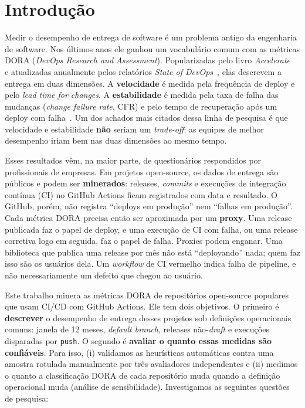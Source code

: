 
\section{Introdução}
\label{sec:introducao}

Medir o desempenho de entrega de software é um problema antigo da engenharia de
software. Nos últimos anos ele ganhou um vocabulário comum com as métricas DORA
(\textit{DevOps Research and Assessment}). Popularizadas pelo livro
\textit{Accelerate}~\cite{forsgren2018accelerate} e atualizadas anualmente pelos
relatórios \textit{State of DevOps}~\cite{dora2024report}, elas descrevem a
entrega em duas dimensões. A \textbf{velocidade} é medida pela frequência de
deploy e pelo \textit{lead time for changes}. A \textbf{estabilidade} é medida
pela taxa de falha das mudanças (\textit{change failure rate}, CFR) e pelo tempo
de recuperação após um deploy com falha~\cite{dora2024fourkeys}. Um dos achados
mais citados dessa linha de pesquisa é que velocidade e estabilidade
\textbf{não} seriam um \textit{trade-off}: as equipes de melhor desempenho iriam
bem nas duas dimensões ao mesmo tempo.

Esses resultados vêm, na maior parte, de questionários respondidos por
profissionais de empresas. Em projetos open-source, os dados de entrega são
públicos e podem ser \textbf{minerados}: releases, \textit{commits} e execuções de
integração contínua (CI) no GitHub Actions ficam registrados com data e
resultado. O GitHub, porém, não registra ``deploys em produção'' nem ``falhas em
produção''. Cada métrica DORA precisa então ser aproximada por um
\textbf{proxy}. Uma release publicada faz o papel de deploy, e uma execução de CI
com falha, ou uma release corretiva logo em seguida, faz o papel de falha.
Proxies podem enganar. Uma biblioteca que publica uma release por mês não está
``deployando'' nada; quem faz isso são os usuários dela. Um \textit{workflow} de
CI vermelho indica falha de pipeline, e não necessariamente um defeito que
chegou ao usuário.

Este trabalho minera as métricas DORA de repositórios open-source populares que
usam CI/CD com GitHub Actions. Ele tem dois objetivos. O primeiro é
\textbf{descrever} o desempenho de entrega desses projetos sob definições
operacionais comuns: janela de 12 meses, \textit{default branch}, releases
não-\textit{draft} e execuções disparadas por \texttt{push}. O segundo é
\textbf{avaliar o quanto essas medidas são confiáveis}. Para isso, (i) validamos
as heurísticas automáticas contra uma amostra rotulada manualmente por três
avaliadores independentes e (ii) medimos o quanto a classificação DORA de cada
repositório muda quando a definição operacional muda (análise de
sensibilidade). Investigamos as seguintes questões de pesquisa:

